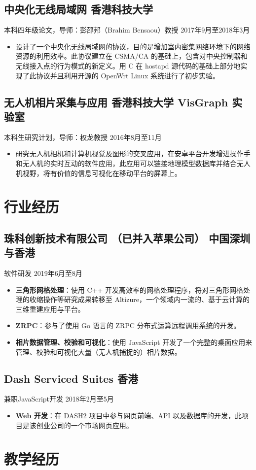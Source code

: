 \documentclass{article}
\newcommand{\subsec}[2]{\subsection*{#1 \hfill {\normalfont\sffamily\kaishu #2}}}
\newcommand{\subsecdesc}[2]{{#1 \hfill\sffamily\kaishu #2}}
\begin{document}
  \subsec{中央化无线局域网}{香港科技大学}
  \subsecdesc{本科四年级论文，导师：彭邵邦（Brahim Bensaou）教授}{2017年9月至2018年3月}
  \begin{itemize}
    \item 设计了一个中央化无线局域网的协议，目的是增加室内密集网络环境下的网络资源的利用效率。此协议建立在 CSMA/CA 的基础上，包含对中央控制器和无线接入点的行为模式的新定义。用 C 在 hostapd 源代码的基础上部分地实现了此协议并且利用开源的 OpenWrt Linux 系统进行了初步实验。
  \end{itemize}

  \subsec{无人机相片采集与应用}{香港科技大学 VisGraph 实验室}
  \subsecdesc{本科生研究计划，导师：权龙教授}{2016年8月至11月}
  \begin{itemize}
    \item 研究无人机相机和计算机视觉及图形的交叉应用，在安卓平台开发增进操作手和无人机的实时互动的软件应用，此应用可以链接地理模型数据库并结合无人机视野，将有价值的信息可视化在移动平台的屏幕上。
  \end{itemize}

\section*{行业经历} %

  \subsec{珠科创新技术有限公司 {\small （已并入苹果公司）}}{中国深圳与香港}
  \subsecdesc{软件研发}{2019年6月至8月}
  \begin{itemize}
    \item \textbf{三角形网格处理}：使用 C++ 开发高效率的网格处理程序，将对三角形网格处理的收缩操作等研究成果转移至 Altizure，一个领域内一流的、基于云计算的三维重建应用与平台。
    \item \textbf{ZRPC}：参与了使用 Go 语言的 ZRPC 分布式运算远程调用系统的开发。
    \item \textbf{相片数据管理、校验和可视化}：使用 JavaScript 开发了一个完整的桌面应用来管理、校验和可视化大量（无人机捕捉的）相片数据。
  \end{itemize}

  \subsec{Dash Serviced Suites}{香港}
  \subsecdesc{兼职JavaScript开发}{2018年2月至5月}
  \begin{itemize}
    \item \textbf{Web 开发}：在 DASH2 项目中参与网页前端、API 以及数据库的开发，此项目是该创业公司的一个市场网页应用。
  \end{itemize}

\section*{教学经历} %
\end{document}
